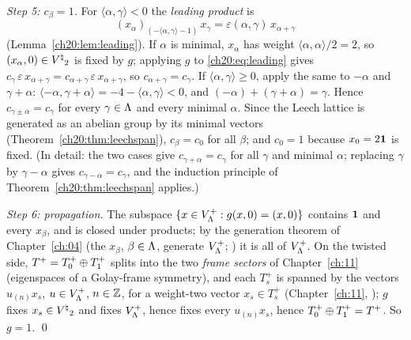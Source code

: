 \emph{Step 5: $c_\beta=1$.}  For $\langle\alpha,\gamma\rangle<0$ the \emph{leading product} is
\begin{equation}\label{ch20:eq:leading}
  (x_\alpha)_{(-\langle\alpha,\gamma\rangle-1)}\,x_\gamma=\varepsilon(\alpha,\gamma)\,x_{\alpha+\gamma}
\end{equation}
(Lemma~\ref{ch20:lem:leading}).  If $\alpha$ is minimal, $x_\alpha$ has weight $\langle\alpha,\alpha\rangle/2=2$, so
$(x_\alpha,0)\in{V^{\natural}}_2$ is fixed by $g$; applying $g$ to \eqref{ch20:eq:leading} gives
$c_\gamma\,\varepsilon\,x_{\alpha+\gamma}=c_{\alpha+\gamma}\,\varepsilon\,x_{\alpha+\gamma}$, so $c_{\alpha+\gamma}=c_\gamma$.  If
$\langle\alpha,\gamma\rangle\ge0$, apply the same to $-\alpha$ and $\gamma+\alpha$:
$\langle-\alpha,\gamma+\alpha\rangle=-4-\langle\alpha,\gamma\rangle<0$, and $(-\alpha)+(\gamma+\alpha)=\gamma$.  Hence
$c_{\gamma\pm\alpha}=c_\gamma$ for every $\gamma\in{\Lambda}$ and every minimal $\alpha$.  Since the Leech lattice is
generated as an abelian group by its minimal vectors (Theorem~\ref{ch20:thm:leechspan}), $c_\beta=c_0$ for all $\beta$;
and $c_0=1$ because $x_0=2\mathbf 1$ is fixed.  (In detail: the two cases give $c_{\gamma+\alpha}=c_\gamma$ for all
$\gamma$ and minimal $\alpha$; replacing $\gamma$ by $\gamma-\alpha$ gives $c_{\gamma-\alpha}=c_\gamma$, and the induction principle of
Theorem~\ref{ch20:thm:leechspan} applies.)

\emph{Step 6: propagation.}  The subspace $\{x\in V_{\Lambda}^{+}: g(x,0)=(x,0)\}$ contains $\mathbf 1$ and every
$x_\beta$, and is closed under products; by the generation theorem of Chapter~\ref{ch:04} (the $x_\beta$, $\beta\in{\Lambda}$,
generate $V_{\Lambda}^{+}$; ) it is all of $V_{\Lambda}^{+}$.  On the twisted side, $T^{+}=T^+_0\oplus T^+_1$ splits into the two
\emph{frame sectors} of Chapter~\ref{ch:11} (eigenspaces of a Golay-frame symmetry), and each $T^+_s$ is spanned by the vectors $u_{(n)}x_s$, $u\in V_{\Lambda}^{+}$, $n\in{\mathbb{Z}}$, for a weight-two
vector $x_s\in T^+_s$ (Chapter~\ref{ch:11}, ); $g$ fixes $x_s\in{V^{\natural}}_2$ and fixes $V_{\Lambda}^{+}$,
hence fixes every $u_{(n)}x_s$, hence $T^+_0\oplus T^+_1=T^{+}$.  So $g=1$. \qed

